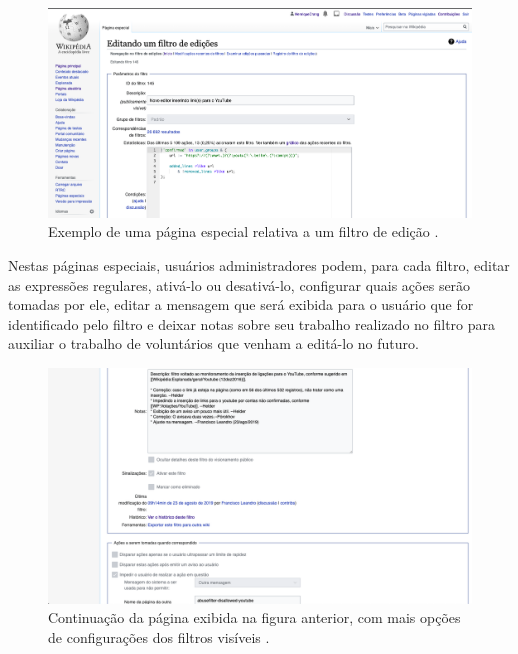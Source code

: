 \begin{figure}[H]
    \centering
    \includegraphics[width=1\textwidth]{Images/pagina_filtro_edicao.png}
    \caption{Exemplo de uma página especial relativa a um filtro de edição .}
    \label{fig:pagina_filtro_edicao}
\end{figure}

Nestas páginas especiais, usuários administradores podem, para cada filtro, editar as expressões regulares, ativá-lo ou desativá-lo, configurar quais ações serão tomadas por ele, editar a mensagem que será exibida para o usuário que for identificado pelo filtro e deixar notas sobre seu trabalho realizado no filtro para auxiliar o trabalho de voluntários que venham a editá-lo no futuro.

\begin{figure}[H]
    \centering
    \includegraphics[width=1\textwidth]{Images/pagina_edicao_administadores.png}
    \caption{Continuação da página exibida na figura anterior, com mais opções de configurações dos filtros visíveis .}
    \label{fig:pagina_edicao_administradores}
\end{figure}

